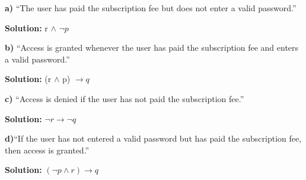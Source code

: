 \documentclass{article}
\begin{document}
\textbf {a)} “The user has paid the subscription fee but does not enter a valid password.” \\

\begin{center}
	\textbf{Solution: } r $\land$ $\neg p$
\end {center} 
\vspace{1cm}
\textbf {b)} “Access is granted whenever the user has paid the subscription fee and enters a valid password.” \\

\begin{center}
	\textbf{Solution: } (r $ \land $ p) $ \rightarrow q$ 
\end {center} 
\vspace{1cm}
\textbf {c)} “Access is denied if the user has not paid the subscription fee.”\\
\begin{center}
\textbf{Solution: } $\neg r \rightarrow \neg q$ 
\end{center}
\vspace{1cm}

\textbf {d)}“If the user has not entered a valid password but has paid the subscription fee, then access is granted.” \\ 
\begin{center}
\textbf {Solution: } $ (\neg p \land r) \rightarrow q $
\end{center}
\newpage
\end{document}
